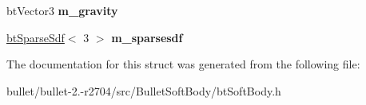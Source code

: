 \begin{DoxyCompactItemize}
\item 
\hypertarget{structbt_soft_body_world_info_ab2c7540c1556ddfb5adb6aeb2fee3392}{bt\+Vector3 {\bfseries m\+\_\+gravity}}\label{structbt_soft_body_world_info_ab2c7540c1556ddfb5adb6aeb2fee3392}

\item 
\hypertarget{structbt_soft_body_world_info_aa8b999bc3c2548d043c07115fd45cceb}{\hyperlink{structbt_sparse_sdf}{bt\+Sparse\+Sdf}$<$ 3 $>$ {\bfseries m\+\_\+sparsesdf}}\label{structbt_soft_body_world_info_aa8b999bc3c2548d043c07115fd45cceb}

\end{DoxyCompactItemize}


The documentation for this struct was generated from the following file\+:\begin{DoxyCompactItemize}
\item 
bullet/bullet-\/2.-\/r2704/src/\+Bullet\+Soft\+Body/bt\+Soft\+Body.\+h\end{DoxyCompactItemize}
